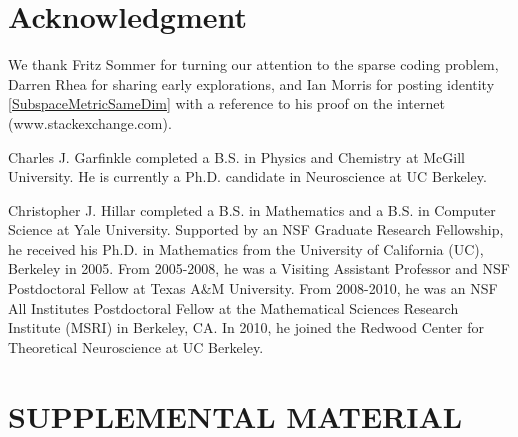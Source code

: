 \documentclass[journal, twocolumn]{IEEEtran}
\begin{document}
\section*{Acknowledgment}
We thank Fritz Sommer for turning our attention to the sparse coding problem, Darren Rhea for sharing early explorations, and Ian Morris for posting identity \eqref{SubspaceMetricSameDim} with a reference to his proof on the internet (www.stackexchange.com). %




\begin{IEEEbiographynophoto}{Charles J. Garfinkle}
completed a B.S. in Physics and Chemistry at McGill University. He is currently a Ph.D. candidate in Neuroscience at UC Berkeley.
\end{IEEEbiographynophoto}

\begin{IEEEbiographynophoto}{Christopher J. Hillar}
completed a B.S. in Mathematics and a B.S. in Computer Science at Yale University.  Supported by an NSF Graduate Research Fellowship, he received his Ph.D. in Mathematics from the University of California (UC), Berkeley in 2005. From 2005-2008, he was a Visiting Assistant Professor and NSF Postdoctoral Fellow at Texas A\&M University. From 2008-2010, he was an NSF All Institutes Postdoctoral Fellow at the Mathematical Sciences Research Institute (MSRI) in Berkeley, CA.  In 2010, he joined the Redwood Center for Theoretical Neuroscience at UC Berkeley.  %
\end{IEEEbiographynophoto}

\clearpage
\section{SUPPLEMENTAL MATERIAL}
\end{document}
